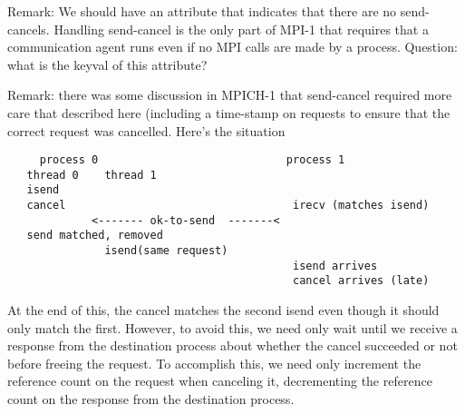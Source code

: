 \documentclass{article}
\begin{document}
\begin{itemize}


\end{itemize}

Remark: We should have an attribute that indicates that there
are no send-cancels.  Handling send-cancel is the only part of MPI-1
that requires that a communication agent runs even if no MPI calls are
made by a process.  Question: what is the keyval of this attribute?

Remark: there was some discussion in MPICH-1 that send-cancel required more
care that described here (including a time-stamp on requests to ensure
that the correct request was cancelled.  Here's the situation
\begin{verbatim}
     process 0                             process 1
   thread 0    thread 1                
   isend 
   cancel                                   irecv (matches isend)
             <------- ok-to-send  -------<
   send matched, removed
               isend(same request)
                                            isend arrives
                                            cancel arrives (late)
\end{verbatim}
At the end of this, the cancel matches the second isend even though it
should only match the first.  However, to avoid this, we need only
wait until we receive a response from the destination process about
whether the cancel succeeded or not before freeing the request.  To
accomplish this, we need only increment the reference count on the
request when canceling it, decrementing the reference count on the
response from the destination process.

\end{document}
